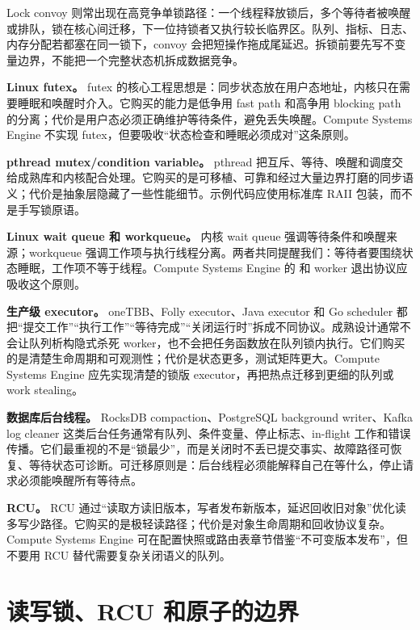 Lock convoy 则常出现在高竞争单锁路径：一个线程释放锁后，多个等待者被唤醒或排队，锁在核心间迁移，下一位持锁者又执行较长临界区。队列、指标、日志、内存分配若都塞在同一锁下，convoy 会把短操作拖成尾延迟。拆锁前要先写不变量边界，不能把一个完整状态机拆成数据竞争。

\begin{casebox}
\textbf{Linux futex。}
futex 的核心工程思想是：同步状态放在用户态地址，内核只在需要睡眠和唤醒时介入。它购买的能力是低争用 fast path 和高争用 blocking path 的分离；代价是用户态必须正确维护等待条件，避免丢失唤醒。Compute Systems Engine 不实现 futex，但要吸收“状态检查和睡眠必须成对”这条原则。

\textbf{pthread mutex/condition variable。}
pthread 把互斥、等待、唤醒和调度交给成熟库和内核配合处理。它购买的是可移植、可靠和经过大量边界打磨的同步语义；代价是抽象层隐藏了一些性能细节。示例代码应使用标准库 RAII 包装，而不是手写锁原语。

\textbf{Linux wait queue 和 workqueue。}
内核 wait queue 强调等待条件和唤醒来源；workqueue 强调工作项与执行线程分离。两者共同提醒我们：等待者要围绕状态睡眠，工作项不等于线程。Compute Systems Engine 的  和 worker 退出协议应吸收这个原则。

\textbf{生产级 executor。}
oneTBB、Folly executor、Java executor 和 Go scheduler 都把“提交工作”“执行工作”“等待完成”“关闭运行时”拆成不同协议。成熟设计通常不会让队列析构隐式杀死 worker，也不会把任务函数放在队列锁内执行。它们购买的是清楚生命周期和可观测性；代价是状态更多，测试矩阵更大。Compute Systems Engine 应先实现清楚的锁版 executor，再把热点迁移到更细的队列或 work stealing。

\textbf{数据库后台线程。}
RocksDB compaction、PostgreSQL background writer、Kafka log cleaner 这类后台任务通常有队列、条件变量、停止标志、in-flight 工作和错误传播。它们最重视的不是“锁最少”，而是关闭时不丢已提交事实、故障路径可恢复、等待状态可诊断。可迁移原则是：后台线程必须能解释自己在等什么，停止请求必须能唤醒所有等待点。

\textbf{RCU。}
RCU 通过“读取方读旧版本，写者发布新版本，延迟回收旧对象”优化读多写少路径。它购买的是极轻读路径；代价是对象生命周期和回收协议复杂。Compute Systems Engine 可在配置快照或路由表章节借鉴“不可变版本发布”，但不要用 RCU 替代需要复杂关闭语义的队列。
\end{casebox}

\section{读写锁、RCU 和原子的边界}


